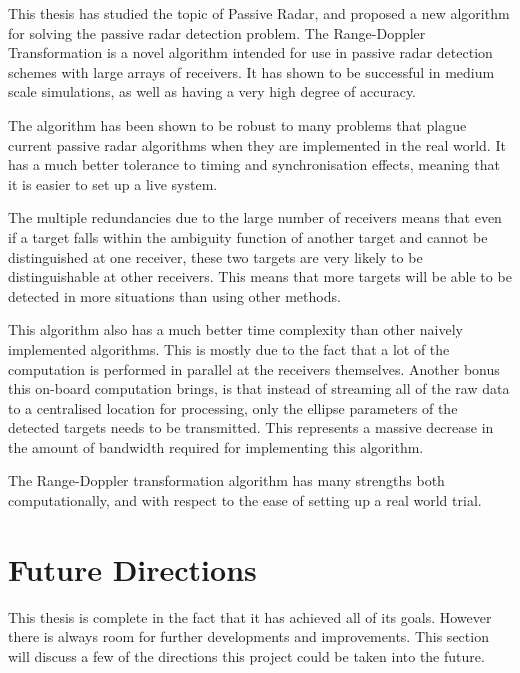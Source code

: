 \documentclass[12pt,openany,a4paper]{book}
\begin{document}
This thesis has studied the topic of Passive Radar, and proposed a new algorithm for solving the passive radar detection problem. The Range-Doppler Transformation is a novel algorithm intended for use in passive radar detection schemes with large arrays of receivers. It has shown to be successful in medium scale simulations, as well as having a very high degree of accuracy.

\bigskip

The algorithm has been shown to be robust to many problems that plague current passive radar algorithms when they are implemented in the real world. It has a much better tolerance to timing and synchronisation effects, meaning that it is easier to set up a live system.

\bigskip

The multiple redundancies due to the large number of receivers means that even if a target falls within the ambiguity function of another target and cannot be distinguished at one receiver, these two targets are very likely to be distinguishable at other receivers. This means that more targets will be able to be detected in more situations than using other methods.

\bigskip

This algorithm also has a much better time complexity than other naively implemented algorithms. This is mostly due to the fact that a lot of the computation is performed in parallel at the receivers themselves. Another bonus this on-board computation brings, is that instead of streaming all of the raw data to a centralised location for processing, only the ellipse parameters of the detected targets needs to be transmitted. This represents a massive decrease in the amount of bandwidth required for implementing this algorithm.

\bigskip

The Range-Doppler transformation algorithm has many strengths both computationally, and with respect to the ease of setting up a real world trial. 

\cleardoublepage

\chapter{Future Directions}

This thesis is complete in the fact that it has achieved all of its goals. However there is always room for further developments and improvements. This section will discuss a few of the directions this project could be taken into the future.
\end{document}

